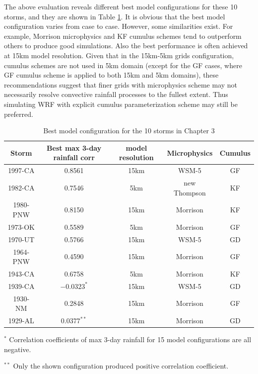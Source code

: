 The above evaluation reveals different best model configurations for these 10 storms, and they are shown in Table \ref{table:3-3}. It is obvious that the best model configuration varies from case to case. However, some similarities exist. For example, Morrison microphysics and KF cumulus schemes tend to outperform others to produce good simulations. Also the best performance is often achieved at 15km model resolution. Given that in the 15km-5km grids configuration, cumulus schemes are not used in 5km domain (except for the GF cases, where GF cumulus scheme is applied to both 15km and 5km domains), these recommendations suggest that finer grids with microphysics scheme may not necessarily resolve convective rainfall processes to the fullest extent. Thus simulating WRF with explicit cumulus parameterization scheme may still be preferred.

\begin{table}[htbp]
	\centering
	\caption{Best model configuration for the 10 storms in Chapter 3}
	\begin{threeparttable}
		\begin{tabular}{ccccc}
		\hline
		Storm & Best max 3-day rainfall corr & model resolution & Microphysics & Cumulus\\
		\hline
		1997-CA & 0.8561 & 15km & WSM-5 & GF\\
		1982-CA & 0.7546 & 5km & new Thompson & KF\\
		1980-PNW & 0.8150 & 15km & Morrison & KF\\
		1973-OK & 0.5589 & 5km & Morrison & GF\\
		1970-UT & 0.5766 & 15km & WSM-5 & GD\\
		1964-PNW & 0.4590 & 15km & Morrison & GF\\
		1943-CA & 0.6758 & 5km & Morrison & KF\\
		1939-CA & $-0.0323^{*}$ & 15km & WSM-5 & GD\\
		1930-NM & 0.2848 & 15km & Morrison & GF\\
		1929-AL & $0.0377^{**}$ & 15km & Morrison & GD\\
		\hline
		\end{tabular}
		\begin{tablenotes}
			\small
			\item $^{*}$ Correlation coefficients of max 3-day rainfall for 15 model configurations are all negative.
			\item $^{**}$ Only the shown configuration produced positive correlation coefficient.
		\end{tablenotes}
	\end{threeparttable}
	\label{table:3-3}
\end{table}

